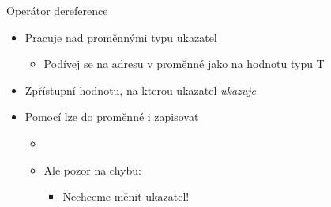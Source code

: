 %
%

\begin{frame}{Operátor dereference \code{*}}

  \begin{itemize}
    \item Pracuje nad proměnnými typu ukazatel
    \begin{itemize}
      \item Podívej se na adresu v proměnné  jako na hodnotu typu T
    \end{itemize}

    \pause

    \item Zpřístupní hodnotu, na kterou ukazatel \emph{ukazuje}

%

    \pause

    \item Pomocí \code{*} lze do proměnné i zapisovat
    \begin{itemize}
      \item {}

      \pause

      \item Ale pozor na chybu: 
      \begin{itemize}
	\item Nechceme měnit ukazatel!
      \end{itemize}
    \end{itemize}

  \end{itemize}

\end{frame}

